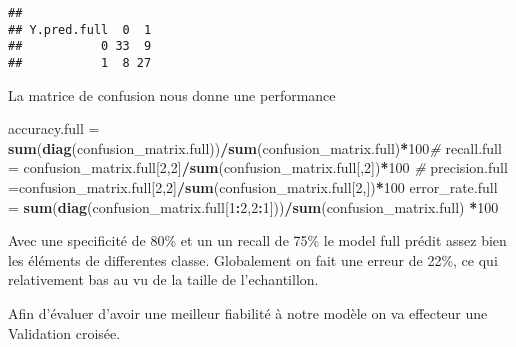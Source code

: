 \documentclass[
]{article}
\newenvironment{Shaded}{\begin{snugshade}}{\end{snugshade}}
\newcommand{\CommentTok}[1]{\textcolor[rgb]{0.56,0.35,0.01}{\textit{#1}}}
\newcommand{\DecValTok}[1]{\textcolor[rgb]{0.00,0.00,0.81}{#1}}
\newcommand{\FloatTok}[1]{\textcolor[rgb]{0.00,0.00,0.81}{#1}}
\newcommand{\KeywordTok}[1]{\textcolor[rgb]{0.13,0.29,0.53}{\textbf{#1}}}
\newcommand{\NormalTok}[1]{#1}
\newcommand{\OperatorTok}[1]{\textcolor[rgb]{0.81,0.36,0.00}{\textbf{#1}}}
\newcommand{\StringTok}[1]{\textcolor[rgb]{0.31,0.60,0.02}{#1}}
\begin{document}
\begin{Shaded}
\end{Shaded}

\begin{verbatim}
##            
## Y.pred.full  0  1
##           0 33  9
##           1  8 27
\end{verbatim}

La matrice de confusion nous donne une performance

\begin{Shaded}
\begin{Highlighting}[]
\NormalTok{accuracy.full =}\StringTok{ }\KeywordTok{sum}\NormalTok{(}\KeywordTok{diag}\NormalTok{(confusion_matrix.full))}\OperatorTok{/}\KeywordTok{sum}\NormalTok{(confusion_matrix.full)}\OperatorTok{*}\DecValTok{100}\CommentTok{#   }
\NormalTok{  recall.full =}\StringTok{ }\NormalTok{confusion_matrix.full[}\DecValTok{2}\NormalTok{,}\DecValTok{2}\NormalTok{]}\OperatorTok{/}\KeywordTok{sum}\NormalTok{(confusion_matrix.full[,}\DecValTok{2}\NormalTok{])}\OperatorTok{*}\DecValTok{100} \CommentTok{#}
\NormalTok{  precision.full =confusion_matrix.full[}\DecValTok{2}\NormalTok{,}\DecValTok{2}\NormalTok{]}\OperatorTok{/}\KeywordTok{sum}\NormalTok{(confusion_matrix.full[}\DecValTok{2}\NormalTok{,])}\OperatorTok{*}\DecValTok{100}
\NormalTok{  error_rate.full =}\StringTok{ }\KeywordTok{sum}\NormalTok{(}\KeywordTok{diag}\NormalTok{(confusion_matrix.full[}\DecValTok{1}\OperatorTok{:}\DecValTok{2}\NormalTok{,}\DecValTok{2}\OperatorTok{:}\DecValTok{1}\NormalTok{]))}\OperatorTok{/}\KeywordTok{sum}\NormalTok{(confusion_matrix.full) }\OperatorTok{*}\DecValTok{100} 
\end{Highlighting}
\end{Shaded}

Avec une specificité de 80\% et un un recall de 75\% le model full
prédit assez bien les éléments de differentes classe. Globalement on
fait une erreur de 22\%, ce qui relativement bas au vu de la taille de
l'echantillon.

Afin d'évaluer d'avoir une meilleur fiabilité à notre modèle on va
effecteur une Validation croisée.
\end{document}
